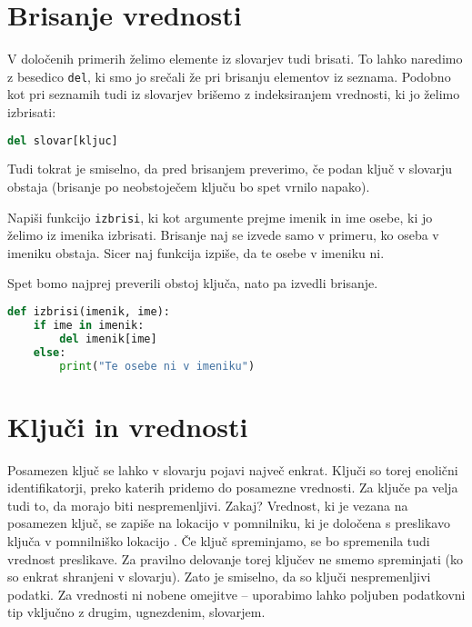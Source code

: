 \section{Brisanje vrednosti}

V določenih primerih želimo elemente iz slovarjev tudi brisati. To lahko naredimo z besedico \texttt{del}, ki smo jo srečali že pri brisanju elementov iz seznama. Podobno kot pri seznamih tudi iz slovarjev brišemo z indeksiranjem vrednosti, ki jo želimo izbrisati:
\begin{lstlisting}[language=Python]
del slovar[kljuc]
\end{lstlisting}
Tudi tokrat je smiselno, da pred brisanjem preverimo, če podan ključ v slovarju obstaja (brisanje po neobstoječem ključu bo spet vrnilo napako).

\begin{zgled}
Napiši funkcijo \texttt{izbrisi}, ki kot argumente prejme imenik in ime osebe, ki jo želimo iz imenika izbrisati. Brisanje naj se izvede samo v primeru, ko oseba v imeniku obstaja. Sicer naj funkcija izpiše, da te osebe v imeniku ni.
\end{zgled}
\begin{resitev}
Spet bomo najprej preverili obstoj ključa, nato pa izvedli brisanje.
\begin{lstlisting}[language=Python]
def izbrisi(imenik, ime):
    if ime in imenik:
        del imenik[ime]
    else:
        print("Te osebe ni v imeniku")
\end{lstlisting}
\end{resitev}

\section{Ključi in vrednosti}

Posamezen ključ se lahko v slovarju pojavi največ enkrat. Ključi so torej enolični identifikatorji, preko katerih pridemo do posamezne vrednosti. Za ključe pa velja tudi to, da morajo biti nespremenljivi. Zakaj? Vrednost, ki je vezana na posamezen ključ, se zapiše na lokacijo v pomnilniku, ki je določena s preslikavo ključa v pomnilniško lokacijo . Če ključ spreminjamo, se bo spremenila tudi vrednost preslikave. Za pravilno delovanje torej ključev ne smemo spreminjati (ko so enkrat shranjeni v slovarju). Zato je smiselno, da so ključi nespremenljivi podatki. Za vrednosti ni nobene omejitve -- uporabimo lahko poljuben podatkovni tip vključno z drugim, ugnezdenim, slovarjem.


